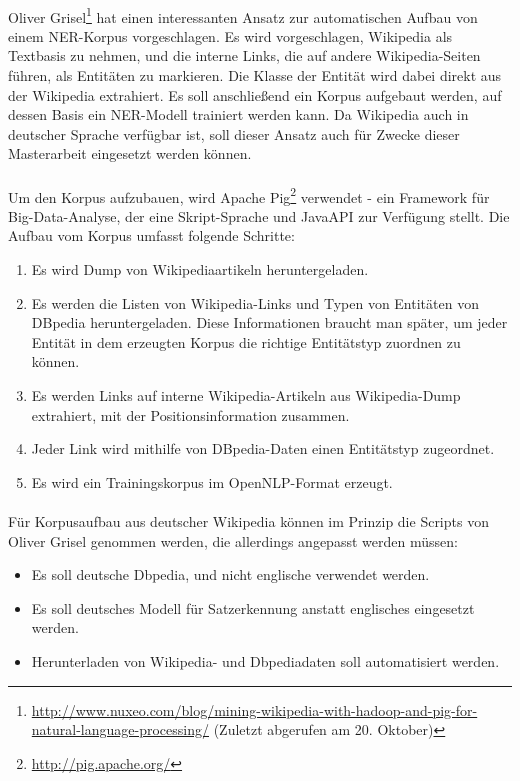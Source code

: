 \paragraph{}
Oliver Grisel\footnote{\url{http://www.nuxeo.com/blog/mining-wikipedia-with-hadoop-and-pig-for-natural-language-processing/} (Zuletzt abgerufen am 20. Oktober)} hat einen interessanten Ansatz zur automatischen Aufbau von einem NER-Korpus vorgeschlagen. Es wird vorgeschlagen, Wikipedia als Textbasis zu nehmen, und die interne Links, die auf andere Wikipedia-Seiten führen, als Entitäten zu markieren. Die Klasse der Entität wird dabei direkt aus der Wikipedia extrahiert. Es soll anschließend ein Korpus aufgebaut werden, auf dessen Basis ein NER-Modell trainiert werden kann. Da Wikipedia auch in deutscher Sprache verfügbar ist, soll dieser Ansatz auch für Zwecke dieser Masterarbeit eingesetzt werden können.

\paragraph{}
Um den Korpus aufzubauen, wird Apache Pig\footnote{\url{http://pig.apache.org/}} verwendet - ein Framework für Big-Data-Analyse, der eine Skript-Sprache und JavaAPI zur Verfügung stellt. Die Aufbau vom Korpus umfasst folgende Schritte:
\begin{enumerate}
\item Es wird Dump von Wikipediaartikeln heruntergeladen.
\item Es werden die Listen von Wikipedia-Links und Typen von Entitäten von DBpedia heruntergeladen. Diese Informationen braucht man später, um jeder Entität in dem erzeugten Korpus die richtige Entitätstyp zuordnen zu können.
\item Es werden Links auf interne Wikipedia-Artikeln aus Wikipedia-Dump extrahiert, mit der Positionsinformation zusammen.
\item Jeder Link wird mithilfe von DBpedia-Daten einen Entitätstyp zugeordnet.
\item Es wird ein Trainingskorpus im OpenNLP-Format erzeugt.
\end{enumerate}

\paragraph{} 
Für Korpusaufbau aus deutscher Wikipedia können im Prinzip die Scripts von Oliver Grisel genommen werden, die allerdings angepasst werden müssen:
\begin{itemize}
\item Es soll deutsche Dbpedia, und nicht englische verwendet werden.
\item Es soll deutsches Modell für Satzerkennung anstatt englisches eingesetzt werden.
\item Herunterladen von Wikipedia- und Dbpediadaten soll automatisiert werden.
\end{itemize}

